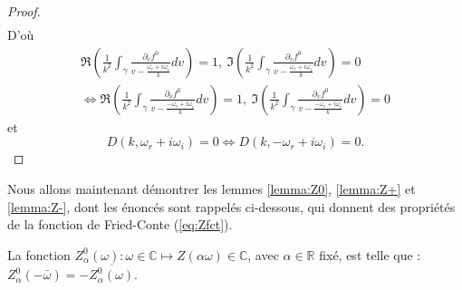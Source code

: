 \begin{proof}
\begin{eqnarray*}
\end{eqnarray*}
D'où
\begin{eqnarray*}
\Re\left(\frac{1}{k^2}\int_\gamma\frac{\partial_vf^0}{v-\frac{\omega_r+i\omega_i}{k}}dv\right)=1,~\Im\left(\frac{1}{k^2}\int_\gamma\frac{\partial_vf^0}{v-\frac{\omega_r+i\omega_i}{k}}dv\right)=0\\
\Leftrightarrow
\Re\left(\frac{1}{k^2}\int_\gamma\frac{\partial_vf^0}{v-\frac{-\omega_r+i\omega_i}{k}}dv\right)=1,~\Im\left(\frac{1}{k^2}\int_\gamma\frac{\partial_vf^0}{v-\frac{-\omega_r+i\omega_i}{k}}dv\right)=0
\end{eqnarray*}
et
$$D(k,\omega_r+i\omega_i)=0\Leftrightarrow D(k,-\omega_r+i\omega_i)=0.$$
\end{proof}

Nous allons maintenant démontrer les lemmes \ref{lemma:Z0}, \ref{lemma:Z+} et \ref{lemma:Z-}, dont les énoncés sont rappelés ci-dessous, qui donnent des propriétés de la fonction de Fried-Conte (\ref{eq:Zfct}).

\begin{lemma}
  La fonction $Z_\alpha^0(\omega):\omega\in\mathbb{C}\mapsto Z\left(\alpha\omega\right)\in\mathbb{C}$, avec $\alpha\in\mathbb{R}$ fixé, est telle que : $Z_\alpha^0(-\bar{\omega}) = -\overline{Z_\alpha^0(\omega)}$.
 \end{lemma}
 
